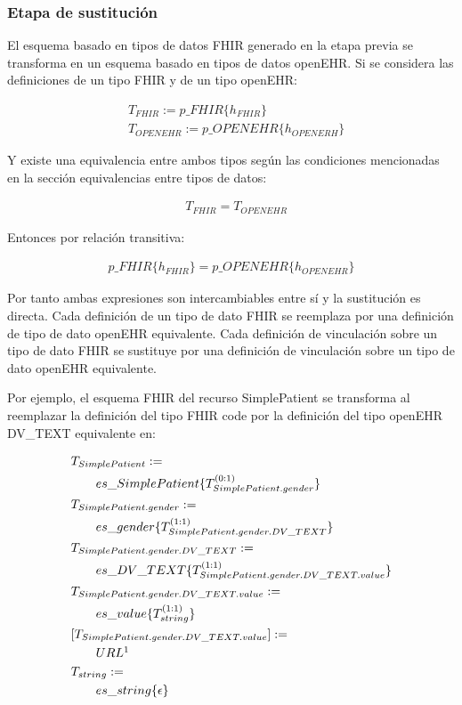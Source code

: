 \subsubsection{Etapa de sustitución}

El esquema basado en tipos de datos FHIR generado en la etapa previa se transforma en un esquema basado en tipos de datos openEHR. Si se considera las definiciones de un tipo FHIR y de un tipo openEHR:

\begin{align*}
&T_{FHIR}:=p\_FHIR\{h_{FHIR}\} \\
&T_{OPENEHR}:=p\_OPENEHR\{h_{OPENERH}\}
\end{align*}

\noindent
Y existe una equivalencia entre ambos tipos según las condiciones mencionadas en la sección equivalencias entre tipos de datos:

\begin{align*}
&T_{FHIR} = T_{OPENEHR}
\end{align*}

\noindent
Entonces por relación transitiva:

\begin{align*}
p\_FHIR\{h_{FHIR}\} = p\_OPENEHR\{h_{OPENEHR}\}
\end{align*}

\noindent
Por tanto ambas expresiones son intercambiables entre sí y la sustitución es directa. Cada definición de un tipo de dato FHIR se reemplaza por una definición de tipo de dato openEHR equivalente. Cada definición de vinculación sobre un tipo de dato FHIR se sustituye por una definición de vinculación sobre un tipo de dato openEHR equivalente.

Por ejemplo, el esquema FHIR del recurso SimplePatient se transforma al reemplazar la definición del tipo FHIR code por la definición del tipo openEHR DV\_TEXT equivalente en:

\begin{align*}
&T_{SimplePatient}:= \\
&\qquad es\_SimplePatient\{T_{SimplePatient.gender}^{(0:1)}\} \\
&T_{SimplePatient.gender}:= \\
&\qquad es\_gender\{T_{SimplePatient.gender.DV\_TEXT}^{(1:1)}\} \\
&T_{SimplePatient.gender.DV\_TEXT}:= \\
&\qquad es\_DV\_TEXT\{T_{SimplePatient.gender.DV\_TEXT.value}^{(1:1)}\} \\
&T_{SimplePatient.gender.DV\_TEXT.value}:= \\
&\qquad es\_value\{T_{string}^{(1:1)}\} \\
&[T_{SimplePatient.gender.DV\_TEXT.value}] := \\
&\qquad URL \footnotemark \\
&T_{string}:= \\
&\qquad es\_string\{\epsilon\} \\
\end{align*}

